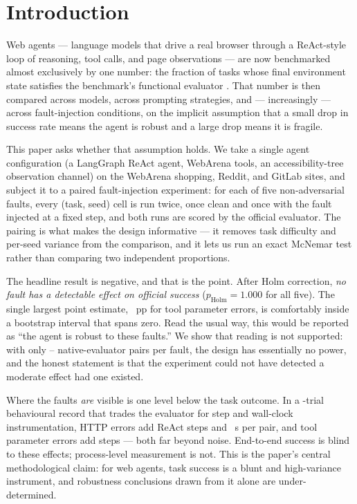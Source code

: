 \section{Introduction}
\label{sec:intro}

Web agents --- language models that drive a real browser through a ReAct-style
loop of reasoning, tool calls, and page observations --- are now benchmarked
almost exclusively by one number: the fraction of tasks whose final environment
state satisfies the benchmark's functional evaluator
\citep{zhou2024webarena, koh2024visualwebarena}. That number is then compared
across models, across prompting strategies, and --- increasingly --- across
fault-injection conditions, on the implicit assumption that a small drop in
success rate means the agent is robust and a large drop means it is fragile.

This paper asks whether that assumption holds. We take a single agent
configuration (a LangGraph ReAct agent, \ToolCount{} WebArena tools, an
accessibility-tree observation channel) on the WebArena shopping, Reddit, and
GitLab sites, and subject it to a paired fault-injection experiment: for each of
five non-adversarial faults, every (task, seed) cell is run twice, once clean and
once with the fault injected at a fixed step, and both runs are scored by the
official evaluator. The pairing is what makes the design informative --- it
removes task difficulty and per-seed variance from the comparison, and it lets us
run an exact McNemar test rather than comparing two independent proportions.

The headline result is negative, and that is the point. After Holm correction,
\emph{no fault has a detectable effect on official success}
($p_{\text{Holm}}=1.000$ for all five). The single largest point estimate,
\ResAgentParamErrorDeltaNat{}~pp for tool parameter errors, is comfortably inside a
bootstrap interval that spans zero. Read the usual way, this would be reported as
``the agent is robust to these faults.'' We show that reading is not supported:
with only \ResWebDomMissingNNat--\ResWebTimeoutNNat{} native-evaluator pairs per
fault, the design has essentially no power, and the honest statement is that the
experiment could not have detected a moderate effect had one existed.

Where the faults \emph{are} visible is one level below the task outcome. In a
\TotalTrials{}-trial behavioural record that trades the evaluator for step and
wall-clock instrumentation, HTTP errors add \ResHttpErrorStepDelta{} ReAct steps
and \ResHttpErrorTimeDelta{}~s per pair, and tool parameter errors add
\ResParamErrStepDelta{} steps --- both far beyond noise. End-to-end success is
blind to these effects; process-level measurement is not. This is the paper's
central methodological claim: for web agents, task success is a blunt and
high-variance instrument, and robustness conclusions drawn from it alone are
under-determined.

